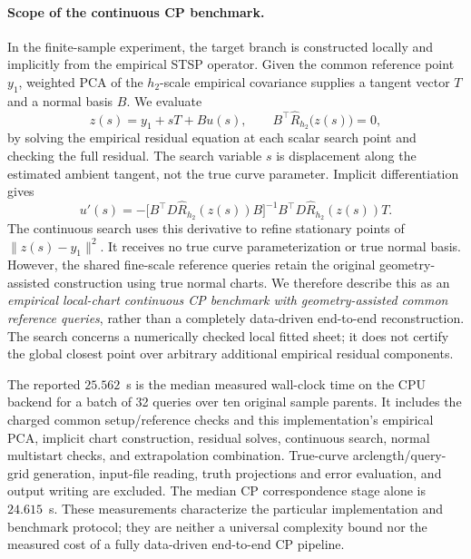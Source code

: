 \paragraph{Scope of the continuous CP benchmark.}
In the finite-sample experiment, the target branch is constructed locally and implicitly from the empirical STSP operator. Given the common reference point $y_1$, weighted PCA of the $h_2$-scale empirical covariance supplies a tangent vector $T$ and a normal basis $B$. We evaluate
\[
z(s)=y_1+sT+Bu(s),\qquad
B^\top\widehat R_{h_2}\bigl(z(s)\bigr)=0,
\]
by solving the empirical residual equation at each scalar search point and checking the full residual. The search variable $s$ is displacement along the estimated ambient tangent, not the true curve parameter. Implicit differentiation gives
\[
u'(s)=-\bigl[B^\top D\widehat R_{h_2}(z(s))B\bigr]^{-1}
B^\top D\widehat R_{h_2}(z(s))T.
\]
The continuous search uses this derivative to refine stationary points of $\|z(s)-y_1\|^2$. It receives no true curve parameterization or true normal basis. However, the shared fine-scale reference queries retain the original geometry-assisted construction using true normal charts. We therefore describe this as an \emph{empirical local-chart continuous CP benchmark with geometry-assisted common reference queries}, rather than a completely data-driven end-to-end reconstruction. The search concerns a numerically checked local fitted sheet; it does not certify the global closest point over arbitrary additional empirical residual components.

The reported $25.562$~s is the median measured wall-clock time on the CPU backend for a batch of 32 queries over ten original sample parents. It includes the charged common setup/reference checks and this implementation's empirical PCA, implicit chart construction, residual solves, continuous search, normal multistart checks, and extrapolation combination. True-curve arclength/query-grid generation, input-file reading, truth projections and error evaluation, and output writing are excluded. The median CP correspondence stage alone is $24.615$~s. These measurements characterize the particular implementation and benchmark protocol; they are neither a universal complexity bound nor the measured cost of a fully data-driven end-to-end CP pipeline.
